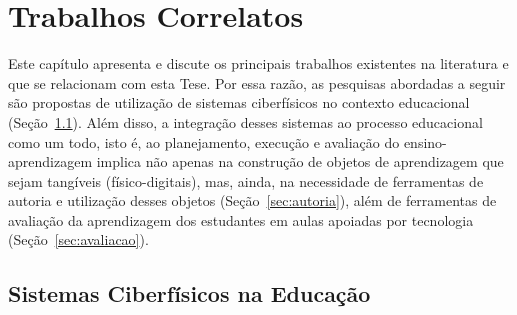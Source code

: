 
\chapter{Trabalhos Correlatos} \label{Chap:relatedWork}


Este capítulo apresenta e discute os principais trabalhos existentes na literatura e que se relacionam com esta Tese. Por essa razão, as pesquisas abordadas a seguir são propostas de utilização de sistemas ciberfísicos no contexto educacional (Seção~\ref{sec:ciberfisicos}). Além disso, a integração desses sistemas ao processo educacional como um todo, isto é, ao planejamento, execução e avaliação do ensino-aprendizagem implica não apenas na construção de objetos de aprendizagem que sejam tangíveis (físico-digitais), mas, ainda, na necessidade de ferramentas de autoria e utilização desses objetos (Seção~\ref{sec:autoria}), além de ferramentas de avaliação da aprendizagem dos estudantes em aulas apoiadas por tecnologia (Seção~\ref{sec:avaliacao}).

\section{Sistemas Ciberfísicos na Educação}
\label{sec:ciberfisicos}


